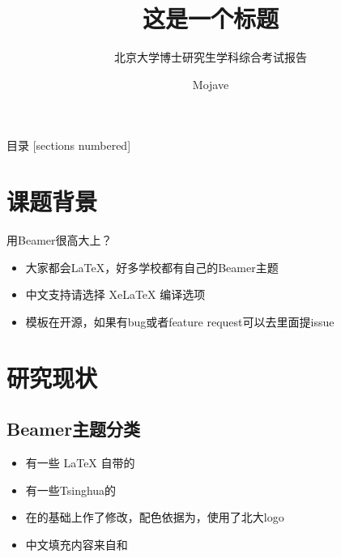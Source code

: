 \documentclass[10pt]{beamer}
\title{这是一个标题}
\subtitle{北京大学博士研究生学科综合考试报告}
\date{}
\author{Mojave}
\institute{北京大学信息科学技术学院}
\begin{document}
\maketitle

\begin{frame}{目录}
  [sections numbered]
  \tableofcontents%
\end{frame}

\section{课题背景}

\begin{frame}{用Beamer很高大上？}
    \begin{itemize}[<+-| alert@+>] %
        \item 大家都会\LaTeX{}，好多学校都有自己的Beamer主题
        \item 中文支持请选择 Xe\LaTeX{} 编译选项
        \item 模板在\hyperlink{https://github.com/mojave-pku/PKUBeamerTheme}{}开源，如果有bug或者feature request可以去里面提issue
    \end{itemize}
\end{frame}

\section{研究现状}

\subsection{Beamer主题分类}

\begin{frame}
    \begin{itemize}
        \item 有一些 \LaTeX{} 自带的
        \item 有一些Tsinghua的
        \item 在\hyperlink{https://www.overleaf.com/latex/templates/unc-charlotte-beamer-theme/rnwqwjmrnmsk}{}的基础上作了修改，配色依据为\hyperlink{https://vim.pku.edu.cn/docs/20171026163443134569.pdf }{}，使用了北大logo
        \item 中文填充内容来自\hyperlink{https://github.com/inFaaa/PKU-Beamer-Theme}{}和\hyperlink{https://github.com/Trinkle23897/THU-Beamer-Theme}{}
    \end{itemize}
\end{frame}
\end{document}
